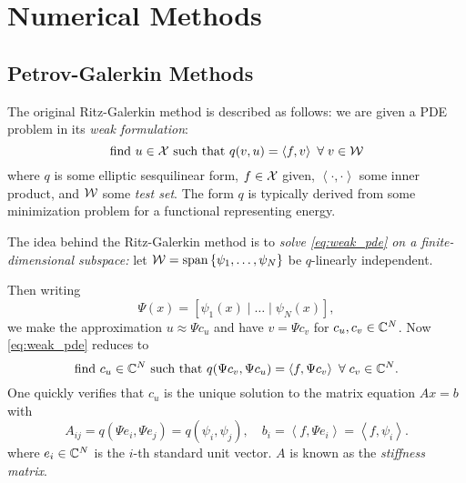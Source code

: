 
\section{Numerical Methods}

\subsection{Petrov-Galerkin Methods}

The original Ritz-Galerkin method is described as follows: we are given a PDE problem in 
its \emph{weak formulation}: 
\begin{equation}
    \label{eq:weak_pde}
    \text{find } u \in \mathcal{X} \text{ such that } q(v, u) 
    = \left\langle f, v \right\rangle\ \forall\; v \in \mathcal{W}
\end{equation}
where $q$ is some elliptic sesquilinear form, $f \in \mathcal{X}$ given, 
$\left\langle \cdot, \cdot \right\rangle$ some inner product, and $\mathcal{W}$ some 
\emph{test set}. The form $q$ is typically derived from some minimization problem for a 
functional representing energy. 

The idea behind the Ritz-Galerkin method is to \emph{solve \ref{eq:weak_pde} on a 
finite-dimensional subspace:} let 
$\mathcal{W} = \text{span} \left\{ \psi_1, \ldots, \psi_N \right\}$ be 
$q$-linearly independent. 

Then writing 
\begin{equation}
    \label{eq:Psi}
    \Psi (x) = \left[ \psi_1 (x) \mid \ldots \mid \psi_N (x) \right] , 
\end{equation}
we make the 
approximation $u \approx \Psi c_u$ and have $v = \Psi c_v$ for $c_u, c_v \in \mathbb{C}^N$. 
Now \ref{eq:weak_pde} reduces to 
\begin{equation}
    \text{find } c_u \in \mathbb{C}^N \text{ such that } 
    q( \Psi c_v, \Psi c_u )
    = \left\langle f, \Psi c_v \right\rangle\ \forall\; c_v \in \mathbb{C}^N . 
\end{equation}
One quickly verifies that $c_u$ is the unique solution to the matrix equation $A x = b$ 
with 
\begin{equation}
    A_{i j} = q( \Psi e_i, \Psi e_j ) = q( \psi_i, \psi_j ), \quad
    b_i = \left\langle f, \Psi e_i \right\rangle 
    = \left\langle f, \psi_i \right\rangle . 
\end{equation}
where $e_i \in \mathbb{C}^N$ is the $i$-th standard unit vector. $A$ is known as the 
\emph{stiffness matrix}. 

